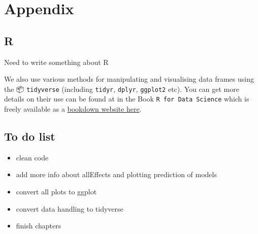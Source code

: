 \documentclass[
  12pt,
]{book}
\providecommand{\tightlist}{%
  \setlength{\itemsep}{0pt}\setlength{\parskip}{0pt}}
\begin{document}
\backmatter

\hypertarget{part-appendix}{%
\part{Appendix}\label{part-appendix}}

\hypertarget{r-1}{%
\chapter*{R}\label{r-1}}

Need to write something about R

We also use various methods for manipulating and visualising data frames using the 📦 \texttt{tidyverse} \citep{R-tidyverse} (including \texttt{tidyr}, \texttt{dplyr}, \texttt{ggplot2} etc).
You can get more details on their use can be found at in the Book \texttt{R\ for\ Data\ Science} \citep{wickhamDataScienceImport2016} which is freely available as a \href{http://r4ds.had.co.nz/}{bookdown website here}.

\hypertarget{to-do-list}{%
\chapter*{To do list}\label{to-do-list}}

\begin{itemize}
\tightlist
\item
  clean code
\item
  add more info about allEffects and plotting prediction of models
\item
  convert all plots to ggplot
\item
  convert data handling to tidyverse
\item
  finish chapters
\end{itemize}

  

\printindex
\end{document}
